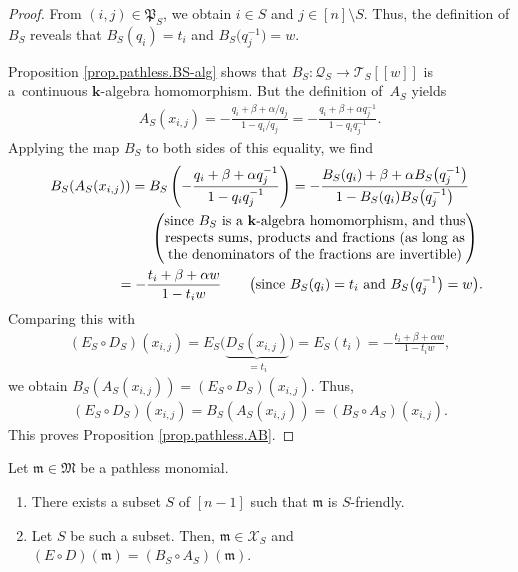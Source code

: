 \begin{proof}From $(i,j) \in\mathfrak{P}_{S}$, we obtain $i\in S$ and $j\in[n] \setminus S$. Thus, the definition of $B_{S}$ reveals that $B_{S} ( q_{i} ) =t_{i}$ and $B_{S}\big( q_{j}^{-1}\big) =w$.

Proposition \ref{prop.pathless.BS-alg} shows that $B_{S}\colon \mathcal{Q}_{S}\rightarrow\mathcal{T}_{S}[[w]] $ is a~continuous $\mathbf{k}$-algebra homomorphism. But the definition of~$A_{S}$ yields
\begin{gather*}
A_{S}(x_{i,j}) =-\frac{q_{i}+\beta+\alpha/q_{j}}{1-q_{i}/q_{j}}=-\frac{q_{i}+\beta+\alpha q_{j}^{-1}}{1-q_{i}q_{j}^{-1}}.
\end{gather*}
Applying the map $B_{S}$ to both sides of this equality, we find
\begin{gather*}
B_{S} ( A_{S}(x_{i,j}) ) =B_{S}\left( -\frac{q_{i}+\beta+\alpha q_{j}^{-1}}{1-q_{i}q_{j}^{-1}}\right)=-\frac{B_{S} ( q_{i} ) +\beta+\alpha B_{S} \big( q_{j}
^{-1}\big) }{1-B_{S}(q_{i}) B_{S}\big( q_{j}^{-1}\big)}\\
\hphantom{B_{S} ( A_{S}(x_{i,j}) )}{} \qquad \left(
\begin{matrix}
\text{since }B_{S}\text{ is a }\mathbf{k}\text{-algebra homomorphism, and
thus}\\
\text{respects sums, products and fractions (as long as}\\
\text{the denominators of the fractions are invertible)}%
\end{matrix}
\right) \\
\hphantom{B_{S} ( A_{S}(x_{i,j}) )}{} =-\frac{t_{i}+\beta+\alpha w}{1-t_{i}w}\qquad \big(\text{since }B_{S}(q_{i}) =t_{i}\text{ and }B_{S}\big(q_{j}^{-1}\big) =w\big) .
\end{gather*}
Comparing this with
\begin{gather*}
( E_{S}\circ D_{S}) (x_{i,j}) =E_{S}\Big(\underbrace{D_{S}(x_{i,j}) }_{=t_{i}}\Big) =E_{S} (t_{i}) =-\frac{t_{i}+\beta+\alpha w}{1-t_{i}w},
\end{gather*}
we obtain $B_{S} ( A_{S}(x_{i,j}) ) = ( E_{S}\circ D_{S}) (x_{i,j}) $. Thus,
\begin{gather*}
( E_{S}\circ D_{S} ) (x_{i,j}) =B_{S} ( A_{S} ( x_{i,j} ) ) = ( B_{S}\circ A_{S} ) (x_{i,j} ) .
\end{gather*}
This proves Proposition \ref{prop.pathless.AB}.
\end{proof}

\begin{Proposition}\label{prop.pathless.S}Let $\mathfrak{m}\in\mathfrak{M}$ be a pathless monomial.
\begin{enumerate}\itemsep=0pt
\item[{\rm (a)}] There exists a subset $S$ of $[n-1] $ such that $\mathfrak{m}$ is $S$-friendly.
\item[{\rm (b)}] Let $S$ be such a subset. Then, $\mathfrak{m}\in\mathcal{X}_{S}$ and $(E\circ D) (\mathfrak{m}) = ( B_{S}\circ A_{S}) (\mathfrak{m}) $.
\end{enumerate}
\end{Proposition}

